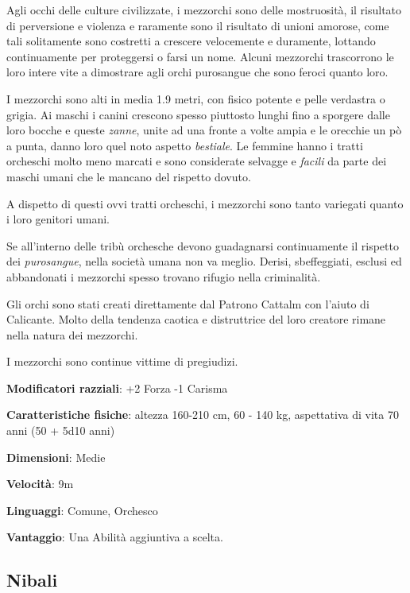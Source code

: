 \begin{multicols}{2}
Agli occhi delle culture civilizzate, i mezzorchi sono delle mostruosità, il risultato di perversione e violenza e raramente sono il risultato di unioni amorose, come tali solitamente sono costretti a crescere velocemente e duramente, lottando continuamente per proteggersi o farsi un nome. Alcuni mezzorchi trascorrono le loro intere vite a dimostrare agli orchi purosangue che sono feroci quanto loro.

I mezzorchi sono alti in media 1.9 metri, con fisico potente e pelle verdastra o grigia. Ai maschi i canini crescono spesso piuttosto lunghi fino a sporgere dalle loro bocche e queste \emph{zanne}, unite ad una fronte a volte ampia e le orecchie un pò a punta, danno loro quel noto aspetto \emph{bestiale}.
Le femmine hanno i tratti orcheschi molto meno marcati e sono considerate selvagge e \emph{facili} da parte dei maschi umani che le mancano del rispetto dovuto.

A dispetto di questi ovvi tratti orcheschi, i mezzorchi sono tanto variegati quanto i loro genitori umani.

Se all'interno delle tribù orchesche devono guadagnarsi continuamente il rispetto dei \emph{purosangue}, nella società umana non va meglio. Derisi, sbeffeggiati, esclusi ed abbandonati i mezzorchi spesso trovano rifugio nella criminalità.

Gli orchi sono stati creati direttamente dal Patrono Cattalm con l'aiuto di Calicante. Molto della tendenza caotica e distruttrice del loro creatore rimane nella natura dei mezzorchi.

I mezzorchi sono continue vittime di pregiudizi.

\textbf{Modificatori razziali}: +2 Forza -1 Carisma

\textbf{Caratteristiche fisiche}: altezza 160-210 cm, 60 - 140 kg, aspettativa di vita 70 anni (50 + 5d10 anni)

\textbf{Dimensioni}: Medie

\textbf{Velocità}: 9m

\textbf{Linguaggi}: Comune, Orchesco

\textbf{Vantaggio}: Una Abilità aggiuntiva a scelta.

\subsection{Nibali}\label{nibali}


\end{multicols}
